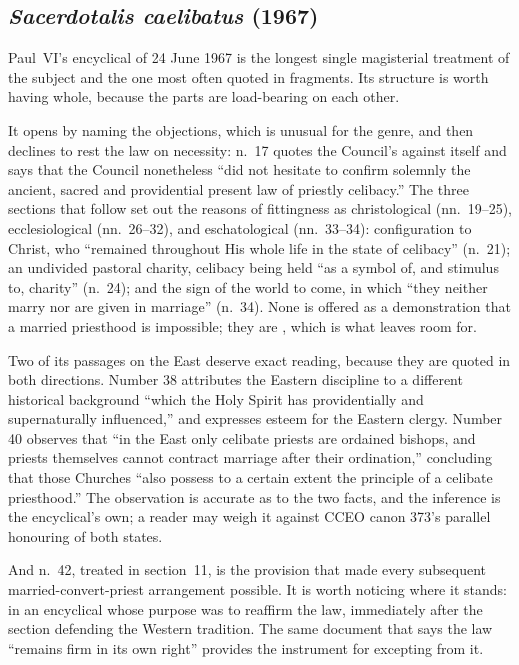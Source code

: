 \subsection{\emph{Sacerdotalis caelibatus} (1967)}

Paul~VI's encyclical of 24 June 1967 is the longest single magisterial treatment of the subject and the one most often quoted in fragments. Its structure is worth having whole, because the parts are load-bearing on each other.

It opens by naming the objections, which is unusual for the genre, and then declines to rest the law on necessity: n.~17 quotes the Council's  against itself and says that the Council nonetheless ``did not hesitate to confirm solemnly the ancient, sacred and providential present law of priestly celibacy.'' The three sections that follow set out the reasons of fittingness as christological (nn.~19--25), ecclesiological (nn.~26--32), and eschatological (nn.~33--34): configuration to Christ, who ``remained throughout His whole life in the state of celibacy'' (n.~21); an undivided pastoral charity, celibacy being held ``as a symbol of, and stimulus to, charity'' (n.~24); and the sign of the world to come, in which ``they neither marry nor are given in marriage'' (n.~34). None is offered as a demonstration that a married priesthood is impossible; they are , which is what  leaves room for.

Two of its passages on the East deserve exact reading, because they are quoted in both directions. Number 38 attributes the Eastern discipline to a different historical background ``which the Holy Spirit has providentially and supernaturally influenced,'' and expresses esteem for the Eastern clergy. Number 40 observes that ``in the East only celibate priests are ordained bishops, and priests themselves cannot contract marriage after their ordination,'' concluding that those Churches ``also possess to a certain extent the principle of a celibate priesthood.'' The observation is accurate as to the two facts, and the inference is the encyclical's own; a reader may weigh it against CCEO canon 373's parallel honouring of both states.

And n.~42, treated in section~11, is the provision that made every subsequent married-convert-priest arrangement possible. It is worth noticing where it stands: in an encyclical whose purpose was to reaffirm the law, immediately after the section defending the Western tradition. The same document that says the law ``remains firm in its own right'' provides the instrument for excepting from it.

